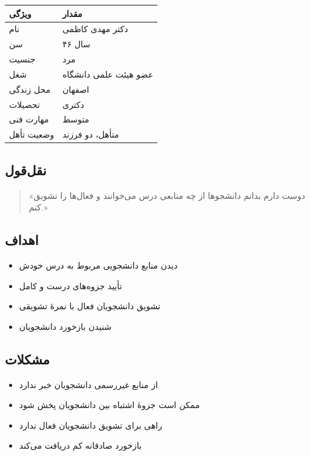 \documentclass[12pt, a4paper]{article}
\begin{document}
{\def\LTcaptype{none} %
\begin{longtable}[]{@{}ll@{}}
\toprule\noalign{}
ویژگی & مقدار \\
\midrule\noalign{}
\endhead
\bottomrule\noalign{}
\endlastfoot
نام & دکتر مهدی کاظمی \\
سن & ۴۶ سال \\
جنسیت & مرد \\
شغل & عضو هیئت علمی دانشگاه \\
محل زندگی & اصفهان \\
تحصیلات & دکتری \\
مهارت فنی & متوسط \\
وضعیت تأهل & متأهل، دو فرزند \\
\end{longtable}
}

\subsection{نقل‌قول}

\begin{quote}
«دوست دارم بدانم دانشجوها از چه منابعی درس می‌خوانند و فعال‌ها را تشویق کنم.»
\end{quote}

\subsection{اهداف}

\begin{itemize}
\tightlist
\item
  دیدن منابع دانشجویی مربوط به درس خودش
\item
  تأیید جزوه‌های درست و کامل
\item
  تشویق دانشجویان فعال با نمرهٔ تشویقی
\item
  شنیدن بازخورد دانشجویان
\end{itemize}

\subsection{مشکلات}

\begin{itemize}
\tightlist
\item
  از منابع غیررسمی دانشجویان خبر ندارد
\item
  ممکن است جزوهٔ اشتباه بین دانشجویان پخش شود
\item
  راهی برای تشویق دانشجویان فعال ندارد
\item
  بازخورد صادقانه کم دریافت می‌کند
\end{itemize}
\end{document}
